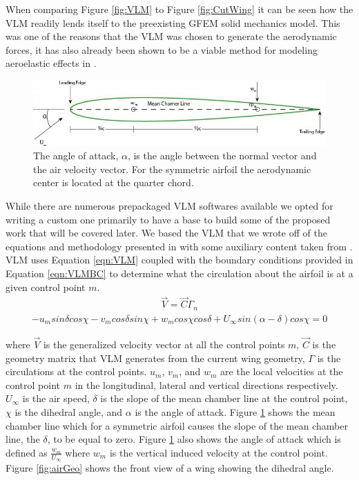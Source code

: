 \documentclass[11pt]{ucthesis}
\begin{document}
When comparing Figure \ref{fig:VLM} to Figure \ref{fig:CutWing} it can be seen how the VLM readily lends itself to the preexisting GFEM solid mechanics model. This was one of the reasons that the VLM was chosen to generate the aerodynamic forces, it has also already been shown to be a viable method for modeling aeroelastic effects in \cite{nguyencoupled,nguyen2012aeroelastic,nguyen2011longitudinal,nguyencoupled2014}.
\begin{figure}[thpb]
\centering
\includegraphics[width=1\linewidth]{Figures/AngleofAttack.jpg}
\caption{The angle of attack, $\alpha$, is the angle between the normal vector and the air velocity vector. For the symmetric airfoil the aerodynamic center is located at the quarter chord.}
\label{fig:alpha}
\end{figure}
While there are numerous prepackaged VLM softwares available we opted for writing a custom one primarily to have a base to build some of the proposed work that will be covered later. We based the VLM that we wrote off of the equations and methodology presented in \cite{bertin1998aerodynamics} with some auxiliary content taken from \cite{kundu2012fluid}. VLM uses Equation \ref{eqn:VLM} coupled with the boundary conditions provided in Equation \ref{eqn:VLMBC} to determine what the circulation about the airfoil is at a given control point $m$.
\begin{eqnarray}
\vec{V} = \vec{C}\Gamma_n
\label{eqn:VLM}
\end{eqnarray}
\begin{eqnarray}
-u_msin\delta cos\chi-v_mcos\delta sin\chi+w_mcos\chi cos\delta+U_{\infty}sin(\alpha-\delta)cos\chi = 0
\label{eqn:VLMBC}
\end{eqnarray}

where $\vec{V}$ is the generalized velocity vector at all the control points $m$, $\vec{C}$ is the geometry matrix that VLM generates from the current wing geometry, $\Gamma$ is the circulations at the control points. $u_m$, $v_m$, and $w_m$ are the local velocities at the control point $m$ in the longitudinal, lateral and vertical directions respectively. $U_{\infty}$ is the air speed, $\delta$ is the slope of the mean chamber line at the control point, $\chi$ is the dihedral angle, and $\alpha$ is the angle of attack. Figure \ref{fig:alpha} shows the mean chamber line which for a symmetric airfoil causes the slope of the mean chamber line, the $\delta$, to be equal to zero. Figure \ref{fig:alpha} also shows the angle of attack which is defined as $\frac{w_m}{U_{\infty}}$ where $w_m$ is the vertical induced velocity at the control point. Figure \ref{fig:airGeo} shows the front view of a wing showing the dihedral angle.
\end{document}
